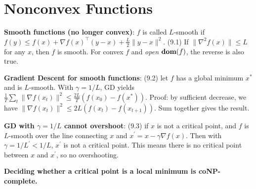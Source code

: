 \section{Nonconvex Functions}

\textbf{Smooth functions (no longer convex)}: $f$ is called $L$-smooth if $f(y) \le f(x)+\nabla f(x)^\top (y-x) + \frac{L}{2}\|y-x\|^2$. (9.1) If $\|\nabla^2 f(x)\|\le L$ for any $x$, then $f$ is smooth. For convex $f$ and \emph{open} $\operatorname{\textbf{dom}}(f)$, the reverse is also true.

\textbf{Gradient Descent for smooth functions}: (9.2) let $f$ has a global minimum $x^*$ and is $L$-smooth. With $\gamma=1/L$, GD yields $\frac{1}{T}\sum_t \|\nabla f(x_t)\|^2 \le \frac{2L}{T}(f(x_0) - f(x^*))$. Proof: by sufficient decrease, we have $\|\nabla f(x_t)\|^2 \le 2L(f(x_t) - f(x_{t+1}))$. Sum together gives the result.

\textbf{GD with $\gamma=1/L$ cannot overshoot}: (9.3) if $x$ is not a critical point, and $f$ is $L$-smooth over the line connecting $x$ and $x^\prime = x - \gamma \nabla f(x)$. Then with $\gamma = 1/L^\prime < 1/L$, $x^\prime$ is not a critical point. This means there is no critical point between $x$ and $x^\prime$, so no overshooting.

\textbf{Deciding whether a critical point is a local minimum is coNP-complete.}